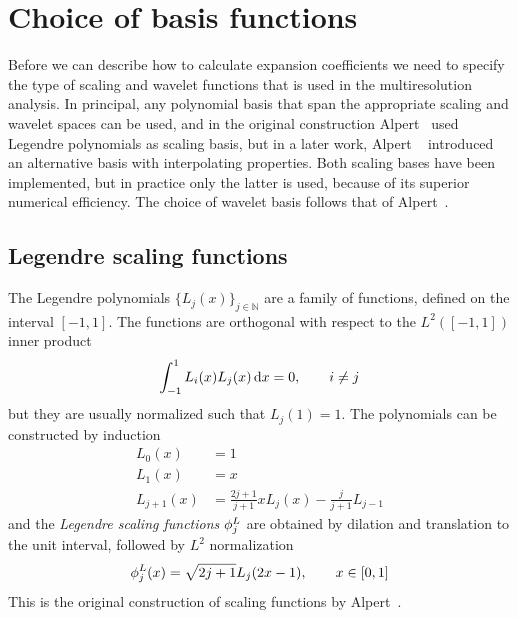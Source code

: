 \section{Choice of basis functions}
Before we can describe how to calculate expansion coefficients we need to specify
the type of scaling and wavelet functions that is used in the multiresolution 
analysis. In principal, any polynomial basis that span the appropriate scaling
 and wavelet  spaces can be used, and in the original 
construction Alpert~\cite{Alpert:1993p5460} used Legendre polynomials as scaling basis, 
but in a later work, Alpert \etal~\cite{Alpert:2002p149} introduced an alternative 
basis with interpolating properties. Both scaling bases have been implemented, but 
in practice only the latter is used, because of its superior numerical efficiency. 
The choice of wavelet basis follows that of Alpert~\cite{Alpert:1993p5460}.

\subsection{Legendre scaling functions}
The Legendre polynomials $\lbrace L_j(x)\rbrace_{j\in \mathbb{N}}$ are a family of 
functions, defined on the interval $[-1,1]$. The functions are orthogonal with 
respect to the $L^2([-1,1])$ inner product
\begin{equation}
    \int_{-1}^{1} L_i(x)L_j(x) \,\mathrm{d} x = 0, \qquad i \neq j
\end{equation}
but they are usually normalized such that $L_j(1) = 1$. The polynomials can be 
constructed by induction
\begin{align}
    L_0(x) &= 1\\
    L_1(x) &= x\\
    L_{j+1}(x) &= \frac{2j+1}{j+1}xL_j(x) - \frac{j}{j+1}L_{j-1}
\end{align}
and the \emph{Legendre scaling functions} $\phi_j^L$ are obtained by dilation 
and translation to the unit interval, followed by $L^2$ normalization
\begin{equation}
    \phi_j^L(x) = \sqrt{2j+1}L_j(2x-1),\qquad x \in [0,1]
\end{equation}
This is the original construction of scaling functions by 
Alpert~\cite{Alpert:1993p5460}.

